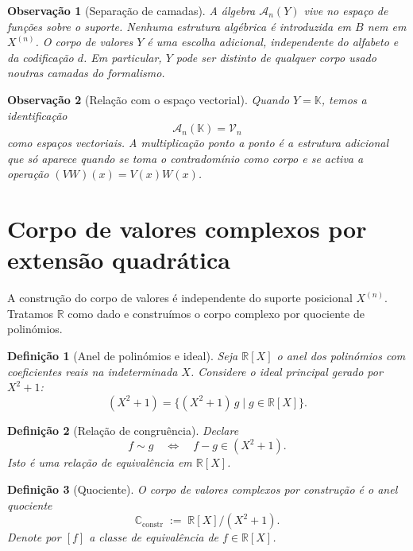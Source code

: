 \documentclass[11pt,a4paper]{article}
\newtheorem{definicao}{Definição}
\newtheorem{observacao}{Observação}
\begin{document}
\begin{observacao}[Separação de camadas]
\label{obs:separacao-algebra}
A álgebra \(\mathcal A_n(Y)\) vive no espaço de funções sobre o suporte.
Nenhuma estrutura algébrica é introduzida em \(B\) nem em \(X^{(n)}\).
O corpo de valores \(Y\) é uma escolha adicional, independente do alfabeto e da codificação \(d\).
Em particular, \(Y\) pode ser distinto de qualquer corpo usado noutras camadas do formalismo.
\end{observacao}

\begin{observacao}[Relação com o espaço vectorial]
\label{obs:relacao-Vn}
Quando \(Y=\mathbb K\), temos a identificação
\[
\mathcal A_n(\mathbb K)
=
\mathcal V_n
\]
como espaços vectoriais.
A multiplicação ponto a ponto é a estrutura adicional que só aparece quando se toma o contradomínio como corpo e se activa a operação \((VW)(x)=V(x)W(x)\).
\end{observacao}

\section{Corpo de valores complexos por extensão quadrática}

A construção do corpo de valores é independente do suporte posicional \(X^{(n)}\).
Tratamos \(\mathbb R\) como dado e construímos o corpo complexo por quociente de polinómios.

\begin{definicao}[Anel de polinómios e ideal]
\label{def:RX}
Seja \(\mathbb R[X]\) o anel dos polinómios com coeficientes reais na indeterminada \(X\).
Considere o ideal principal gerado por \(X^2+1\):
\[
(X^2+1)
=
\{(X^2+1)\,g
\mid
g\in\mathbb R[X]\}.
\]
\end{definicao}

\begin{definicao}[Relação de congruência]
\label{def:congruencia}
Declare
\[
f\sim g
\quad\Longleftrightarrow\quad
f-g\in(X^2+1).
\]
Isto é uma relação de equivalência em \(\mathbb R[X]\).
\end{definicao}

\begin{definicao}[Quociente]
\label{def:Cconstr}
O corpo de valores complexos por construção é o anel quociente
\[
\mathbb C_{\mathrm{constr}}
\;:=\;
\mathbb R[X]/(X^2+1).
\]
Denote por \([f]\) a classe de equivalência de \(f\in\mathbb R[X]\).
\end{definicao}
\end{document}
